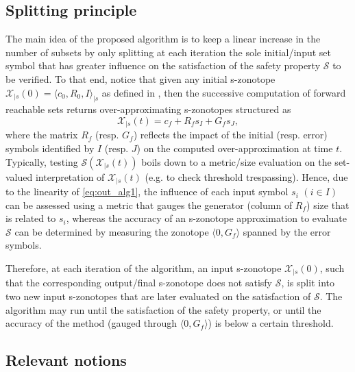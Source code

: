 \documentclass[journal]{IEEEtran}
\begin{document}
\vspace*{-2mm}
\subsection{Splitting principle}\label{sec:general_idea_part}

The main idea of the proposed algorithm is to keep a linear increase in the number of subsets by only splitting at each iteration the sole initial/input set symbol that has greater influence on the satisfaction of the safety property $\mathcal{S}$ to be verified. To that end, notice that given any initial s-zonotope $\mathcal{X}_{|s}(0) = \langle c_0, R_0, I\rangle_{|s}$ as defined in , then the successive computation of forward reachable sets returns
 over-approximating s-zonotopes structured as
\begin{equation}\label{eq:out_alg1}
   \mathcal{X}_{|s}(t) =   c_f + R_fs_I + G_fs_J, 
\end{equation}
\noindent where the matrix $R_f$ (resp. $G_f$) reflects the impact of the initial (resp. error) symbols identified by $I$ (resp. $J$) on the computed over-approximation at time $t$. Typically, testing $\mathcal{S}(\mathcal{X}_{|s}(t) )$ boils down to a metric/size evaluation on the set-valued interpretation of $\mathcal{X}_{|s}(t) $ (e.g. to check threshold trespassing). Hence, due to the linearity of \eqref{eq:out_alg1}, the influence of each input symbol $s_i$  $(i\in I)$ can be assessed using a metric that gauges the generator (column of $R_f$) size that is related to $s_i$, whereas the accuracy of an s-zonotope approximation to evaluate $\mathcal{S}$ can be determined by measuring the zonotope $\langle 0, G_f\rangle$ spanned by the error symbols. 

Therefore, at each iteration of the algorithm, an input s-zonotope $\mathcal{X}_{|s}(0)$, such that the corresponding output/final s-zonotope does not satisfy $\mathcal{S}$, is split into two new input s-zonotopes that are later evaluated on the satisfaction of $\mathcal{S}$. The algorithm may run until the satisfaction of the safety property, or until the accuracy of the method (gauged through $\langle 0, G_f\rangle$) is below a certain threshold.


\subsection{Relevant notions} \label{sec:related_notions}
\end{document}
